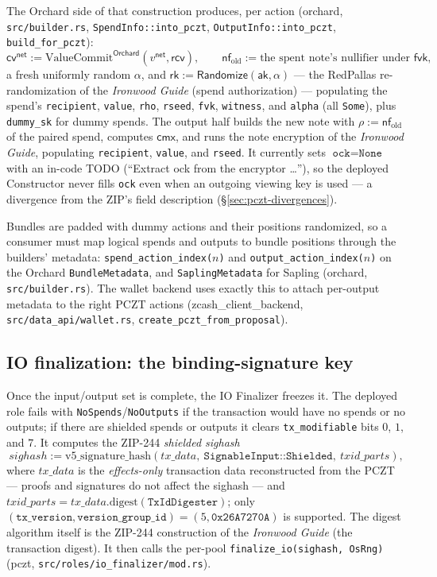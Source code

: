 \documentclass[11pt,a4paper]{article}
\theoremstyle{definition}
\newcommand{\nfsym}{\mathsf{nf}}
\newcommand{\cmx}{\mathsf{cmx}}
\newcommand{\cvsym}{\mathsf{cv}}
\newcommand{\rk}{\mathsf{rk}}
\newcommand{\aksym}{\ensuremath{\mathsf{ak}}}
\newcommand{\fvk}{\ensuremath{\mathsf{fvk}}}
\newcommand{\rcv}{\ensuremath{\mathsf{rcv}}}
\begin{document}
The Orchard side of that construction produces, per action
(\textsf{orchard}, \texttt{src/builder.rs}, \texttt{SpendInfo::into\_pczt},
\texttt{OutputInfo::into\_pczt}, \texttt{build\_for\_pczt}):
\[
\cvsym^{\mathsf{net}} := \mathrm{ValueCommit}^{\mathsf{Orchard}}
(v^{\mathsf{net}}, \rcv), \qquad
\nfsym_{\mathrm{old}} := \text{the spent note's nullifier under } \fvk,
\]
a fresh uniformly random $\alpha$, and
$\rk := \mathsf{Randomize}(\aksym, \alpha)$ --- the RedPallas
re-randomization of the \emph{Ironwood Guide} (spend authorization) ---
populating the spend's \texttt{recipient}, \texttt{value}, \texttt{rho},
\texttt{rseed}, \texttt{fvk}, \texttt{witness}, and \texttt{alpha} (all
\texttt{Some}), plus \texttt{dummy\_sk} for dummy spends. The output half
builds the new note with $\rho := \nfsym_{\mathrm{old}}$ of the paired
spend, computes $\cmx$, and runs the note encryption of the
\emph{Ironwood Guide}, populating \texttt{recipient}, \texttt{value}, and
\texttt{rseed}. It currently sets $\texttt{ock} = \texttt{None}$ with an
in-code TODO (``Extract ock from the encryptor \dots''), so the deployed
Constructor never fills \texttt{ock} even when an outgoing viewing key is
used --- a divergence from the ZIP's field description
(\S\ref{sec:pczt-divergences}).

Bundles are padded with dummy actions and their positions randomized, so
a consumer must map logical spends and outputs to bundle positions
through the builders' metadata: \texttt{spend\_action\_index($n$)} and
\texttt{output\_action\_index($n$)} on the Orchard
\texttt{BundleMetadata}, and \texttt{SaplingMetadata} for Sapling
(\textsf{orchard}, \texttt{src/builder.rs}). The wallet backend uses
exactly this to attach per-output metadata to the right PCZT actions
(\textsf{zcash\_client\_backend}, \texttt{src/data\_api/wallet.rs},
\texttt{create\_pczt\_from\_proposal}).

\subsection{IO finalization: the binding-signature key}%
\label{sec:pczt-iofin}

Once the input/output set is complete, the IO Finalizer freezes it. The
deployed role fails with \texttt{NoSpends}/\texttt{NoOutputs} if the
transaction would have no spends or no outputs; if there are shielded
spends or outputs it clears \texttt{tx\_modifiable} bits $0$, $1$, and
$7$. It computes the ZIP-244 \emph{shielded sighash}
\[
\mathit{sighash} := \mathrm{v5\_signature\_hash}(\mathit{tx\_data},\
\texttt{SignableInput::Shielded},\ \mathit{txid\_parts}),
\]
where $\mathit{tx\_data}$ is the \emph{effects-only} transaction data
reconstructed from the PCZT --- proofs and signatures do not affect the
sighash --- and $\mathit{txid\_parts} =
\mathit{tx\_data}.\mathrm{digest}(\texttt{TxIdDigester})$; only
$(\texttt{tx\_version}, \texttt{version\_group\_id}) = (5,
\mathtt{0x26A7270A})$ is supported. The digest algorithm itself is the
ZIP-244 construction of the \emph{Ironwood Guide} (the transaction
digest). It then calls the per-pool
\texttt{finalize\_io(sighash, OsRng)} (\textsf{pczt},
\texttt{src/roles/io\_finalizer/mod.rs}).
\end{document}
